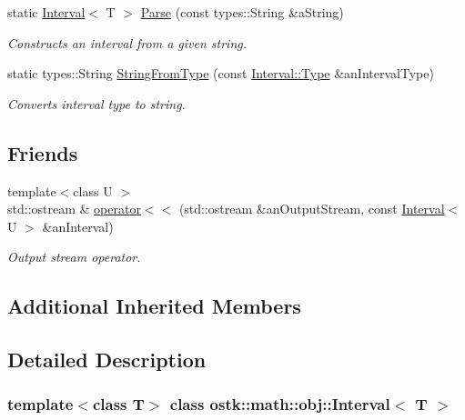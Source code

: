 \begin{DoxyCompactItemize}
static \hyperlink{classostk_1_1math_1_1obj_1_1_interval}{Interval}$<$ T $>$ \hyperlink{classostk_1_1math_1_1obj_1_1_interval_a8013b6fe2914101612ae83ee815110e4}{Parse} (const types\+::\+String \&a\+String)
\begin{DoxyCompactList}\small\item\em Constructs an interval from a given string. \end{DoxyCompactList}\item 
static types\+::\+String \hyperlink{classostk_1_1math_1_1obj_1_1_interval_abe58217bb3d134390c49652e53e2e57e}{String\+From\+Type} (const \hyperlink{classostk_1_1math_1_1obj_1_1_interval_base_a0dd9bd29a9bfefa26de9b88ac81de92a}{Interval\+::\+Type} \&an\+Interval\+Type)
\begin{DoxyCompactList}\small\item\em Converts interval type to string. \end{DoxyCompactList}\end{DoxyCompactItemize}
\subsection*{Friends}
\begin{DoxyCompactItemize}
\item 
{\footnotesize template$<$class U $>$ }\\std\+::ostream \& \hyperlink{classostk_1_1math_1_1obj_1_1_interval_a3aa32afa8cb5d85eeb45540b0bf5657b}{operator$<$$<$} (std\+::ostream \&an\+Output\+Stream, const \hyperlink{classostk_1_1math_1_1obj_1_1_interval}{Interval}$<$ U $>$ \&an\+Interval)
\begin{DoxyCompactList}\small\item\em Output stream operator. \end{DoxyCompactList}\end{DoxyCompactItemize}
\subsection*{Additional Inherited Members}


\subsection{Detailed Description}
\subsubsection*{template$<$class T$>$\newline
class ostk\+::math\+::obj\+::\+Interval$<$ T $>$}

